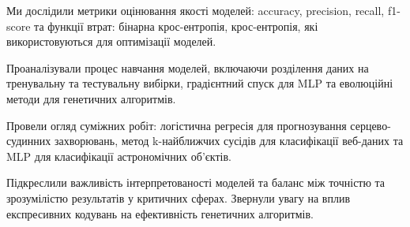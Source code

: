 Ми дослідили метрики оцінювання якості моделей: accuracy, precision, recall, f1-score та функції втрат: бінарна крос-ентропія, крос-ентропія, які використовуються для оптимізації моделей.

Проаналізували процес навчання моделей, включаючи розділення даних на тренувальну та тестувальну вибірки, градієнтний спуск для MLP та еволюційні методи для генетичних алгоритмів.

Провели огляд суміжних робіт: логістична регресія для прогнозування серцево-судинних захворювань, метод k-найближчих сусідів для класифікації веб-даних та MLP для класифікації астрономічних об'єктів.

Підкреслили важливість інтерпретованості моделей та баланс між точністю та зрозумілістю результатів у критичних сферах. Звернули увагу на вплив експресивних кодувань на ефективність генетичних алгоритмів.